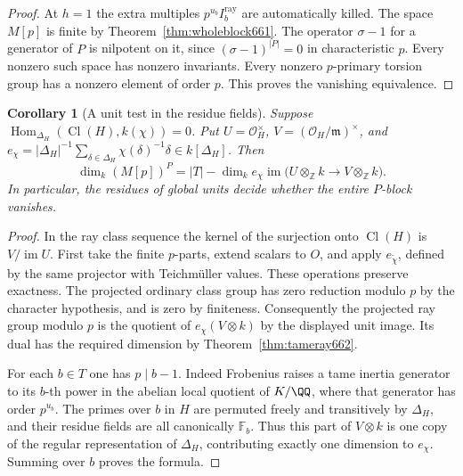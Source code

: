 \documentclass[a4paper,11pt]{article}
\newtheorem{corollary}[proposition]{Corollary}
\theoremstyle{definition}
\theoremstyle{remark}
\newcommand{\ZZ}{\mathbb Z}\newcommand{\ord}{\operatorname{ord}}
\numberwithin{equation}{section}
\newcommand{\Cl}{\operatorname{Cl}}
\begin{document}
\begin{proof}
At \(h=1\) the extra multiples \(p^{u_b}I_b^{\mathrm{ray}}\)
are automatically killed. The space \(M[p]\) is finite by
Theorem~\ref{thm:wholeblock661}. The operator \(\sigma-1\) for
a generator of \(P\) is nilpotent on it, since
\((\sigma-1)^{|P|}=0\) in characteristic \(p\).
Every nonzero such space has nonzero invariants. Every nonzero
\(p\)-primary torsion group has a nonzero element of order \(p\).
This proves the vanishing equivalence.
\end{proof}

\begin{corollary}[A unit test in the residue fields]
\leavevmode\label{cor:unitrows662}
Suppose \(\operatorname{Hom}_{\Delta_H}(\Cl(H),k(\chi))=0\).
Put \(U=\mathcal O_H^\times\), \(V=(\mathcal O_H/\mathfrak m)^\times\),
and \(e_\chi=|\Delta_H|^{-1}\sum_{\delta\in\Delta_H}
\chi(\delta)^{-1}\delta\in k[\Delta_H]\). Then
\[
 \dim_k(M[p])^P
  = |T|-\dim_k e_\chi\operatorname{im}
       \big(U\otimes_{\ZZ}k\longrightarrow V\otimes_{\ZZ}k\big).
\]
In particular, the residues of global units decide whether the
entire \(P\)-block vanishes.
\end{corollary}
\begin{proof}
In the ray class sequence the kernel of the surjection onto
\(\Cl(H)\) is \(V/\operatorname{im}U\). First take the finite
\(p\)-parts, extend scalars to \(O\), and apply
\(e_{\widetilde\chi}\), defined by the same projector with
Teichm\"uller values. These operations preserve exactness.
The projected ordinary class group has zero reduction modulo \(p\)
by the character hypothesis, and is zero by finiteness.
Consequently the projected ray group modulo \(p\) is the quotient
of \(e_\chi(V\otimes k)\) by the displayed unit image. Its dual
has the required dimension by Theorem~\ref{thm:tameray662}.

For each \(b\in T\) one has \(p\mid b-1\). Indeed Frobenius
raises a tame inertia generator to its \(b\)-th power in the
abelian local quotient of \(K/\QQ\), where that generator has
order \(p^{u_b}\). The primes over \(b\) in \(H\) are permuted
freely and transitively by \(\Delta_H\), and their residue
fields are all canonically \(\mathbb F_b\). Thus this part of
\(V\otimes k\) is one copy of the regular representation of
\(\Delta_H\), contributing exactly one dimension to \(e_\chi\).
Summing over \(b\) proves the formula.
\end{proof}
\end{document}
